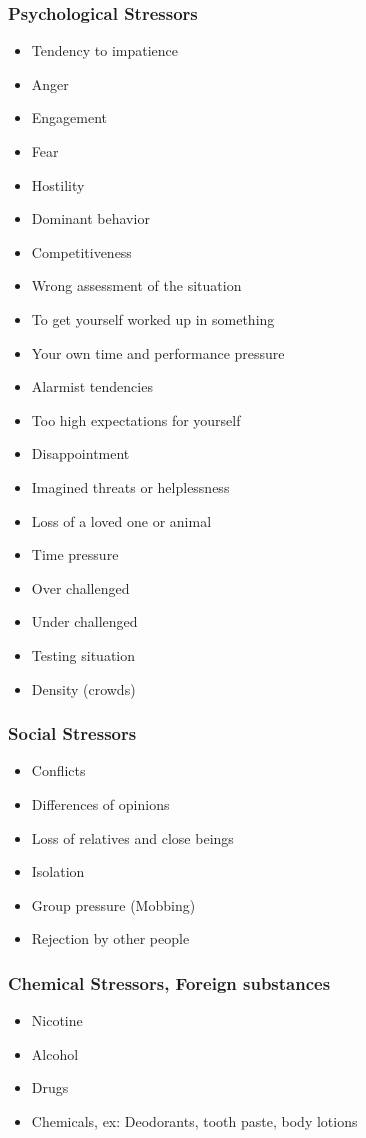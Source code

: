 \documentclass[../Book.Stress_regulation.tex]{subfiles}
\begin{document}
\subsubsection{Psychological Stressors}


\begin{itemize}
\item Tendency to impatience
\item Anger
\item Engagement
\item Fear
\item Hostility
\item Dominant behavior
\item Competitiveness
\item Wrong assessment of the situation
\item To get yourself worked up in something
\item Your own time and performance pressure
\item Alarmist tendencies
\item Too high expectations for yourself
\item Disappointment
\item Imagined threats or helplessness
\item Loss of a loved one or animal 
\item Time pressure
\item Over challenged
\item Under challenged
\item Testing situation
\item Density (crowds)
\end{itemize}



\subsubsection{Social Stressors}

\begin{itemize}
\item Conflicts
\item Differences of opinions
\item Loss of relatives and close beings
\item Isolation
\item Group pressure (Mobbing)
\item Rejection by other people
\end{itemize}

\subsubsection{Chemical Stressors, Foreign substances}
\begin{itemize}
\item Nicotine
\item Alcohol
\item Drugs
\item Chemicals, ex: Deodorants, tooth paste, body lotions
\end{itemize} 
\end{document}

